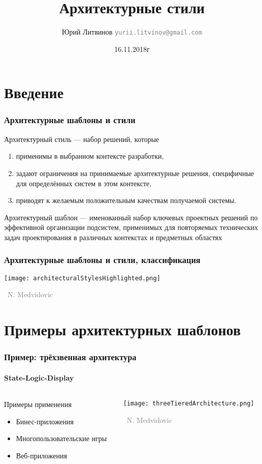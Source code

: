 \documentclass[xetex,mathserif,serif]{beamer}
\title{Архитектурные стили}
\author[Юрий Литвинов]{Юрий Литвинов \newline \textcolor{gray}{\small\texttt{yurii.litvinov@gmail.com}}}
\date{16.11.2018г}
\newcommand{\attribution}[1] {
	\vspace{-5mm}\begin{flushright}\begin{scriptsize}\textcolor{gray}{\textcopyright\, #1}\end{scriptsize}\end{flushright}
}
\begin{document}
	
	\frame{\titlepage}

	\section{Введение}

	\begin{frame}
		\frametitle{Архитектурные шаблоны и стили}
		Архитектурный стиль --- набор решений, которые
		\begin{enumerate}
			\item применимы в выбранном контексте разработки,
			\item задают ограничения на принимаемые архитектурные решения, специфичные для определённых систем в этом контексте,
			\item приводят к желаемым положительным качествам получаемой системы.
		\end{enumerate}
		Архитектурный шаблон --- именованный набор ключевых проектных решений по эффективной организации подсистем, применимых для повторяемых технических задач проектирования в различных контекстах и предметных областях
	\end{frame}

	\begin{frame}
		\frametitle{Архитектурные шаблоны и стили, классификация}
		\begin{center}
			\texttt{[image: architecturalStylesHighlighted.png]}
			\attribution{N. Medvidovic}
		\end{center}
	\end{frame}

	\section{Примеры архитектурных шаблонов}

	\begin{frame}
		\frametitle{Пример: трёхзвенная архитектура}
		\framesubtitle{State-Logic-Display}
		\begin{columns}
			\begin{column}{0.5\textwidth}
				Примеры применения
				\begin{itemize}
					\item Бинес-приложения
					\item Многопользовательские игры
					\item Веб-приложения
				\end{itemize}
			\end{column}
			\begin{column}{0.5\textwidth}
				\begin{center}
					\texttt{[image: threeTieredArchitecture.png]}
					\attribution{N. Medvidovic}
				\end{center}
			\end{column}
		\end{columns}
	\end{frame}
\end{document}
